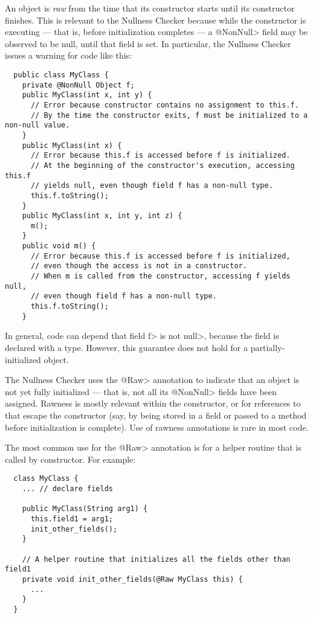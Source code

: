 An object is
\emph{raw} from the time that its constructor starts until its constructor
finishes.  This is relevant to the Nullness Checker because while the
constructor is executing --- that is, before initialization completes ---
a \<@NonNull>
field may be observed to be null, until that field is set.  In
particular, the Nullness Checker issues a warning for code like this:

\begin{Verbatim}
  public class MyClass {
    private @NonNull Object f;
    public MyClass(int x, int y) {
      // Error because constructor contains no assignment to this.f.
      // By the time the constructor exits, f must be initialized to a non-null value.
    }
    public MyClass(int x) {
      // Error because this.f is accessed before f is initialized.
      // At the beginning of the constructor's execution, accessing this.f
      // yields null, even though field f has a non-null type.
      this.f.toString();
    }
    public MyClass(int x, int y, int z) {
      m();
    }
    public void m() {
      // Error because this.f is accessed before f is initialized,
      // even though the access is not in a constructor.
      // When m is called from the constructor, accessing f yields null,
      // even though field f has a non-null type.
      this.f.toString();
    }
\end{Verbatim}

\noindent
In general, code can depend that field \<f> is not \<null>, because the
field is declared with a  type.
However, this guarantee does not hold for a partially-initialized object.

The Nullness Checker uses the \<@Raw> annotation to indicate that an object
is not yet fully initialized --- that is, not all its \<@NonNull> fields have been
assigned.  Rawness is mostly relevant within the constructor, or for
references to  that escape the constructor (say, by being stored
in a field or passed to a method before initialization is complete).  
Use of rawness annotations is rare in most code.

The most common use for the \<@Raw> annotation is for a helper routine that
is called by constructor.  For example:

\begin{Verbatim}
  class MyClass {
    ... // declare fields

    public MyClass(String arg1) {
      this.field1 = arg1;
      init_other_fields();
    }

    // A helper routine that initializes all the fields other than field1
    private void init_other_fields(@Raw MyClass this) {
      ...
    }
  }
\end{Verbatim}

